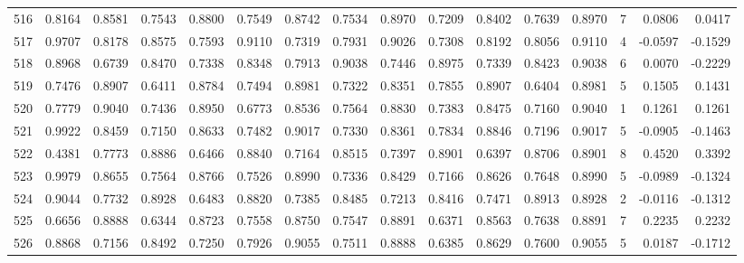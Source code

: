 \begin{tabular}{lrrrrrrrrrrrrrrr}
516 &      0.8164 &  0.8581 &  0.7543 &  0.8800 &  0.7549 &  0.8742 &  0.7534 &  0.8970 &  0.7209 &  0.8402 &   0.7639 &     0.8970 &      7 &                    0.0806 &                     0.0417 \\
517 &      0.9707 &  0.8178 &  0.8575 &  0.7593 &  0.9110 &  0.7319 &  0.7931 &  0.9026 &  0.7308 &  0.8192 &   0.8056 &     0.9110 &      4 &                   -0.0597 &                    -0.1529 \\
518 &      0.8968 &  0.6739 &  0.8470 &  0.7338 &  0.8348 &  0.7913 &  0.9038 &  0.7446 &  0.8975 &  0.7339 &   0.8423 &     0.9038 &      6 &                    0.0070 &                    -0.2229 \\
519 &      0.7476 &  0.8907 &  0.6411 &  0.8784 &  0.7494 &  0.8981 &  0.7322 &  0.8351 &  0.7855 &  0.8907 &   0.6404 &     0.8981 &      5 &                    0.1505 &                     0.1431 \\
520 &      0.7779 &  0.9040 &  0.7436 &  0.8950 &  0.6773 &  0.8536 &  0.7564 &  0.8830 &  0.7383 &  0.8475 &   0.7160 &     0.9040 &      1 &                    0.1261 &                     0.1261 \\
521 &      0.9922 &  0.8459 &  0.7150 &  0.8633 &  0.7482 &  0.9017 &  0.7330 &  0.8361 &  0.7834 &  0.8846 &   0.7196 &     0.9017 &      5 &                   -0.0905 &                    -0.1463 \\
522 &      0.4381 &  0.7773 &  0.8886 &  0.6466 &  0.8840 &  0.7164 &  0.8515 &  0.7397 &  0.8901 &  0.6397 &   0.8706 &     0.8901 &      8 &                    0.4520 &                     0.3392 \\
523 &      0.9979 &  0.8655 &  0.7564 &  0.8766 &  0.7526 &  0.8990 &  0.7336 &  0.8429 &  0.7166 &  0.8626 &   0.7648 &     0.8990 &      5 &                   -0.0989 &                    -0.1324 \\
524 &      0.9044 &  0.7732 &  0.8928 &  0.6483 &  0.8820 &  0.7385 &  0.8485 &  0.7213 &  0.8416 &  0.7471 &   0.8913 &     0.8928 &      2 &                   -0.0116 &                    -0.1312 \\
525 &      0.6656 &  0.8888 &  0.6344 &  0.8723 &  0.7558 &  0.8750 &  0.7547 &  0.8891 &  0.6371 &  0.8563 &   0.7638 &     0.8891 &      7 &                    0.2235 &                     0.2232 \\
526 &      0.8868 &  0.7156 &  0.8492 &  0.7250 &  0.7926 &  0.9055 &  0.7511 &  0.8888 &  0.6385 &  0.8629 &   0.7600 &     0.9055 &      5 &                    0.0187 &                    -0.1712 \\

\end{tabular}
